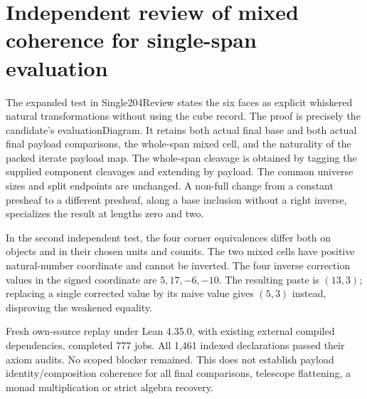\documentclass{article}
\begin{document}
\section*{Independent review of mixed coherence for single-span evaluation}
The expanded test in Single204Review states the six faces as explicit whiskered natural transformations without using the cube record. The proof is precisely the candidate's evaluationDiagram. It retains both actual final base and both actual final payload comparisons, the whole-span mixed cell, and the naturality of the packed iterate payload map. The whole-span cleavage is obtained by tagging the supplied component cleavages and extending by payload. The common universe sizes and split endpoints are unchanged. A non-full change from a constant presheaf to a different presheaf, along a base inclusion without a right inverse, specializes the result at lengths zero and two.
\par In the second independent test, the four corner equivalences differ both on objects and in their chosen units and counits. The two mixed cells have positive natural-number coordinate and cannot be inverted. The four inverse correction values in the signed coordinate are $5,17,-6,-10$. The resulting paste is $(13,3)$; replacing a single corrected value by its naive value gives $(5,3)$ instead, disproving the weakened equality.
\par Fresh own-source replay under Lean 4.35.0, with existing external compiled dependencies, completed 777 jobs. All 1,461 indexed declarations passed their axiom audits. No scoped blocker remained. This does not establish payload identity/composition coherence for all final comparisons, telescope flattening, a monad multiplication or strict algebra recovery.
\end{document}

